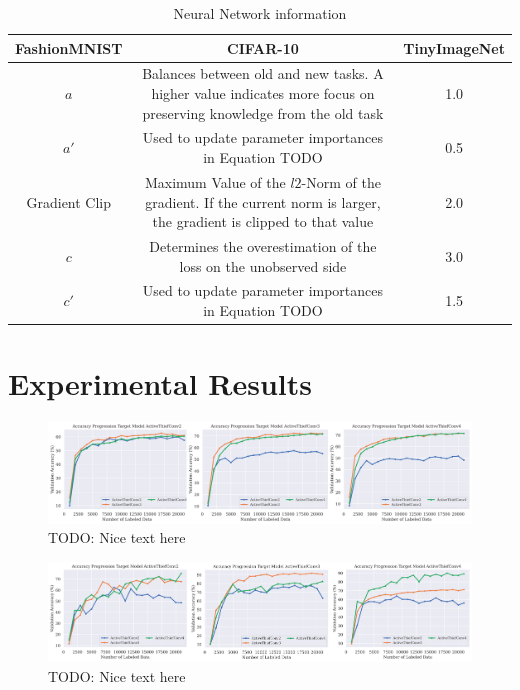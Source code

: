 \begin{table}[h!]
    \centering
    \begin{tabularx}{\textwidth}{c | c c } 
        \hline
         FashionMNIST & CIFAR-10 & TinyImageNet \\ 
        \hline 
        $a$ & Balances between old and new tasks. A higher value indicates more focus
        on preserving knowledge from the old task & 1.0  \\ 
        $a'$ & Used to update parameter importances in Equation TODO & 0.5  \\
        Gradient Clip & Maximum Value of the $l2$-Norm of the gradient. If the current norm is larger, the
        gradient is clipped to that value & 2.0 \\ 
        $c$ & Determines the overestimation of the loss on the unobserved side & 3.0 \\
        $c'$ & Used to update parameter importances in Equation TODO & 1.5 \\
        \hline
    \end{tabularx}
    \caption{Neural Network information}
    \label{fig:NNArchitectures}
\end{table}

\section{Experimental Results}
\label{sec:Appendix:Results}

\begin{figure}[h]
    \centering
    \includegraphics[width=\linewidth]{images/results_CALMS/cifar10_model_comp.png}
    \caption[Accuracy Progression for Model Stealing on CIFAR-10 using different ActiveThief models]{TODO: Nice text here}
    \label{fig:CIFAR10modelComp}
\end{figure}

\begin{figure}[h]
    \centering
    \includegraphics[width=\linewidth]{images/results_CALMS/mnist_model_comp.png}
    \caption[Accuracy Progression for Model Stealing on MNIST using different ActiveThief models]{TODO: Nice text here}
    \label{fig:MNISTmodelComp}
\end{figure}


